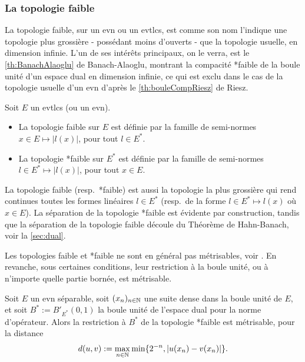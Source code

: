 \subsubsection{La topologie faible}

La topologie faible, sur un evn ou un evtlcs, est comme son nom l'indique une topologie plus grossière - possédant moins d'ouverts - que la topologie usuelle, en dimension infinie. L'un de ses intérêts principaux, on le verra, est le \cref{th:BanachAlaoglu} de Banach-Alaoglu, montrant la compacité *faible de la boule unité d'un espace dual en dimension infinie, ce qui est exclu dans le cas de la topologie usuelle d'un evn d'après le \cref{th:bouleCompRiesz} de Riesz.

\begin{definition}
\label{def:topoFaible}
%
Soit $E$ un evtlcs (ou un evn). 
\begin{itemize}
	\item La topologie faible sur $E$ est définie par la famille de semi-normes $x\in E\mapsto |l(x)|$, pour tout $l \in E^*$. 
	\item La topologie *faible sur $E^*$ est définie par la famille de semi-normes $l \in E^* \mapsto |l(x)|$, pour tout $x\in E$. 
\end{itemize}	
\end{definition}

La topologie faible (resp.\ *faible) est aussi la topologie la plus grossière qui rend continues toutes les formes linéaires $l\in E^*$ (resp.\ de la forme $l\in E^*\mapsto l(x)$ où $x \in E$).
La séparation de la topologie *faible est évidente par construction, tandis que la séparation de la topologie faible découle du Théorème de Hahn-Banach, voir la \cref{sec:dual}.

Les topologies faible et *faible ne sont en général pas métrisables, voir \cite[exercice]{alazard2017analyse}.
En revanche, sous certaines conditions, leur restriction à la boule unité, ou à n'importe quelle partie bornée, est métrisable. 
\begin{proposition}
\label{prop:bouleMetrisable}
%
	Soit $E$ un evn séparable, soit $(x_n)_{n \in \mathbb{N}}$ une suite dense dans la boule unité de $E$, et soit $B^* := B'_{E^*}(0,1)$ la boule unité de l'espace dual pour la norme d'opérateur. 
	Alors la restriction à $B^*$ de la topologie *faible est métrisable, pour la distance
	\begin{equation}
	\label{eqdef:met_faible_boule}
		d(u,v) := \max_{n \in \bN} \min \{2^{-n}, |u(x_n)-v(x_n)|\}.
\leancheck{eqdef:met_faible_boule}%
	\end{equation}
\end{proposition}
	
